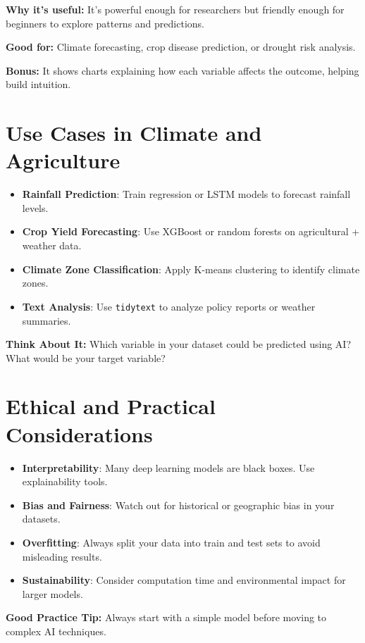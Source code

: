 \textbf{Why it’s useful:} It's powerful enough for researchers but friendly enough for beginners to explore patterns and predictions.

\textbf{Good for:} Climate forecasting, crop disease prediction, or drought risk analysis.

\textbf{Bonus:} It shows charts explaining how each variable affects the outcome, helping build intuition.

\section{Use Cases in Climate and Agriculture}

\begin{itemize}
  \item \textbf{Rainfall Prediction}: Train regression or LSTM models to forecast rainfall levels.
  \item \textbf{Crop Yield Forecasting}: Use XGBoost or random forests on agricultural + weather data.
  \item \textbf{Climate Zone Classification}: Apply K-means clustering to identify climate zones.
  \item \textbf{Text Analysis}: Use \texttt{tidytext} to analyze policy reports or weather summaries.
\end{itemize}

\textbf{Think About It:} Which variable in your dataset could be predicted using AI? What would be your target variable?

\section{Ethical and Practical Considerations}

\begin{itemize}
  \item \textbf{Interpretability}: Many deep learning models are black boxes. Use explainability tools.
  \item \textbf{Bias and Fairness}: Watch out for historical or geographic bias in your datasets.
  \item \textbf{Overfitting}: Always split your data into train and test sets to avoid misleading results.
  \item \textbf{Sustainability}: Consider computation time and environmental impact for larger models.
\end{itemize}

\textbf{Good Practice Tip:} Always start with a simple model before moving to complex AI techniques.

